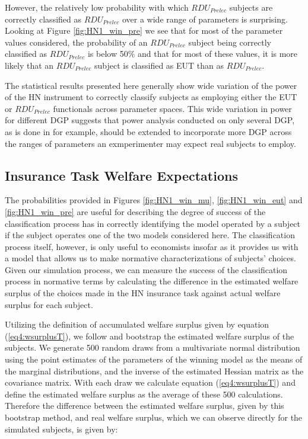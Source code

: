\documentclass[../main.tex]{subfiles}
\begin{document}
However, the relatively low probability with which $\mathit{RDU_{Prelec}}$ subjects are correctly classified as $\mathit{RDU_{Prelec}}$ over a wide range of parameters is surprising.
Looking at Figure \ref{fig:HN1_win_pre} we see that for most of the parameter values considered, the probability of an $\mathit{RDU_{Prelec}}$ subject being correctly classified as $\mathit{RDU_{Prelec}}$ is below 50\% and that for most of these values, it is more likely that an $\mathit{RDU_{Prelec}}$ subject is classified as EUT than as $\mathit{RDU_{Prelec}}$.

The statistical results presented here generally show wide variation of the power of the HN instrument to correctly classify subjects as employing either the EUT or $\mathit{RDU_{Prelec}}$ functionals across parameter spaces.
This wide variation in power for different DGP suggests that power analysis conducted on only several DGP, as is done in \textcite{Wilcox2015} for example, should be extended to incorporate more DGP across the ranges of parameters an exmperimenter may expect real subjects to employ.

\subsection{\texorpdfstring{\textcite{Harrison2016}}{Harrison and Ng (2016)} Insurance Task Welfare Expectations}
\label{sec4:WT}

The probabilities provided in Figures \ref{fig:HN1_win_mu}, \ref{fig:HN1_win_eut} and \ref{fig:HN1_win_pre} are useful for describing the degree of success of the classification process has in correctly identifying the model operated by a subject if the subject operates one of the two models considered here.
The classification process itself, however, is only useful to economists insofar as it provides us with a model that allows us to make normative characterizations of subjects' choices.
Given our simulation process, we can measure the success of the classification process in normative terms by calculating the difference in the estimated welfare surplus of the choices made in the HN insurance task against actual welfare surplus for each subject.

Utilizing the definition of accumulated welfare surplus given by equation (\ref{eq4:wsurplusT}), we follow \textcite[110-111]{Harrison2016} and bootstrap the estimated welfare surplus of the subjects.
We generate 500 random draws from a multivariate normal distribution using the point estimates of the parameters of the winning model as the means of the marginal distributions, and the inverse of the estimated Hessian matrix as the covariance matrix.{\footnotemark}
With each draw we calculate equation (\ref{eq4:wsurplusT}) and define the estimated welfare surplus as the average of these 500 calculations.
Therefore the difference between the estimated welfare surplus, given by this bootstrap method, and real welfare surplus, which we can observe directly for the simulated subjects, is given by:
\end{document}
